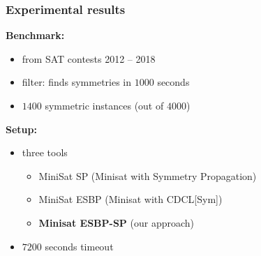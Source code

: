 \documentclass{beamer}
\begin{document}
\begin{frame}
\frametitle{Experimental results}

\textbf{Benchmark:}
\begin{itemize}
	\item from SAT contests 2012 -- 2018
	\item filter: \bliss{} finds  symmetries in $1000$ seconds
	\item $1400$ symmetric instances (out of $4000$)
\end{itemize}

\vfill

\textbf{Setup:}
\begin{itemize}
	\item three tools
	\begin{itemize}
		\item  MiniSat SP (Minisat with Symmetry Propagation)
		\item  MiniSat ESBP (Minisat with CDCL[Sym])
		\item  \textbf{Minisat ESBP-SP} (our approach)
	\end{itemize}
	\item $7200$ seconds timeout
\end{itemize}

\centering


\end{frame}

\end{document}
